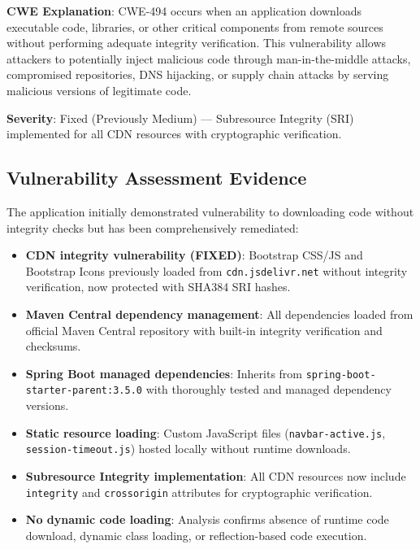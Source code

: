 \documentclass[]{UCD_CS_FYP_Report}
\begin{document}
\textbf{CWE Explanation}: CWE-494 occurs when an application downloads executable code, libraries, or other critical components from remote sources without performing adequate integrity verification. This vulnerability allows attackers to potentially inject malicious code through man-in-the-middle attacks, compromised repositories, DNS hijacking, or supply chain attacks by serving malicious versions of legitimate code.

\textbf{Severity}: Fixed (Previously Medium) — Subresource Integrity (SRI) implemented for all CDN resources with cryptographic verification.

\subsection{Vulnerability Assessment Evidence}
The application initially demonstrated vulnerability to downloading code without integrity checks but has been comprehensively remediated:
\begin{itemize}
	\item \textbf{CDN integrity vulnerability (FIXED)}: Bootstrap CSS/JS and Bootstrap Icons previously loaded from \texttt{cdn.jsdelivr.net} without integrity verification, now protected with SHA384 SRI hashes.
	\item \textbf{Maven Central dependency management}: All dependencies loaded from official Maven Central repository with built-in integrity verification and checksums.
	\item \textbf{Spring Boot managed dependencies}: Inherits from \texttt{spring-boot-starter-parent:3.5.0} with thoroughly tested and managed dependency versions.
	\item \textbf{Static resource loading}: Custom JavaScript files (\texttt{navbar-active.js}, \texttt{session-timeout.js}) hosted locally without runtime downloads.
	\item \textbf{Subresource Integrity implementation}: All CDN resources now include \texttt{integrity} and \texttt{crossorigin} attributes for cryptographic verification.
	\item \textbf{No dynamic code loading}: Analysis confirms absence of runtime code download, dynamic class loading, or reflection-based code execution.
\end{itemize}
\end{document}
